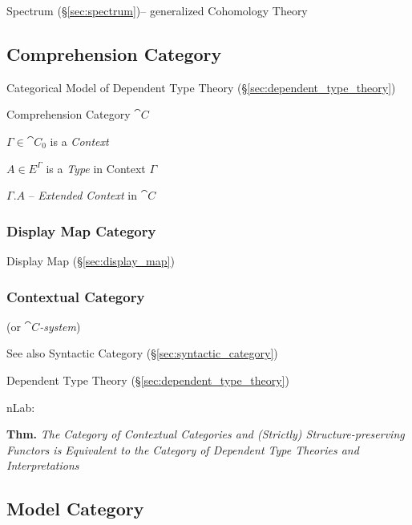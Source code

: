Spectrum (\S\ref{sec:spectrum})-- generalized Cohomology Theory



\subsection{Comprehension Category}\label{sec:comprehension_category}

Categorical Model of Dependent Type Theory
(\S\ref{sec:dependent_type_theory})

Comprehension Category $\cat{C}$

$\Gamma \in \cat{C}_0$ is a \emph{Context}

$A \in E^\Gamma$ is a \emph{Type} in Context $\Gamma$

$\Gamma.A$ -- \emph{Extended Context} in $\cat{C}$



\subsubsection{Display Map Category}\label{sec:display_map_category}

Display Map (\S\ref{sec:display_map})



\subsubsection{Contextual Category}\label{sec:contextual_category}

(or \emph{$\cat{C}$-system})

\fist See also Syntactic Category (\S\ref{sec:syntactic_category})

Dependent Type Theory (\S\ref{sec:dependent_type_theory})

nLab:

\textbf{Thm.} \emph{The Category of Contextual Categories and
  (Strictly) Structure-preserving Functors is Equivalent to the
  Category of Dependent Type Theories and Interpretations} %



\subsection{Model Category}\label{sec:model_category}

